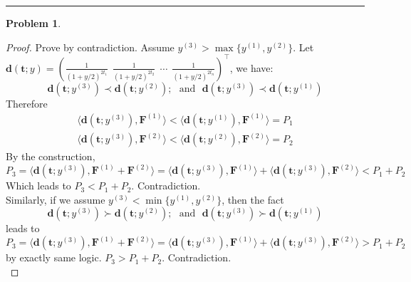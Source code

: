 \documentclass[a4paper, 10pt]{article}
\theoremstyle{definition}
\newtheorem{problem}{Problem}
\theoremstyle{hSol}
\begin{document}
\noindent\rule{16cm}{0.4pt}
\begin{problem} 
\end{problem}
\begin{proof} Prove by contradiction. Assume $y^{(3)}>\max\{y^{(1)}, y^{(2)}\}$. Let $\bm{d}(\bm{t}; y) = (\tfrac{1}{(1+y/2)^{2t_1}} ~~ \tfrac{1}{(1+y/2)^{2t_2}} ~~\cdots~~ \tfrac{1}{(1+y/2)^{2t_n}})^{\top}$, we have:
\begin{equation}
  \bm{d}(\bm{t}; y^{(3)}) \prec \bm{d}(\bm{t}; y^{(2)});~~~\text{and}~~~\bm{d}(\bm{t}; y^{(3)}) \prec \bm{d}(\bm{t}; y^{(1)})
\end{equation}
Therefore
\begin{equation}
  \begin{split}
    \langle \bm{d}(\bm{t}; y^{(3)}), \bm{F}^{(1)} \rangle < \langle \bm{d}(\bm{t}; y^{(1)}), \bm{F}^{(1)} \rangle = P_1 \\
    \langle \bm{d}(\bm{t}; y^{(3)}), \bm{F}^{(2)} \rangle < \langle \bm{d}(\bm{t}; y^{(2)}), \bm{F}^{(2)} \rangle = P_2
  \end{split}
\end{equation}
By the construction, 
\begin{equation}
  P_3 = \langle \bm{d}(\bm{t}; y^{(3)}),  \bm{F}^{(1)}+\bm{F}^{(2)}\rangle = \langle \bm{d}(\bm{t}; y^{(3)}), \bm{F}^{(1)} \rangle + \langle \bm{d}(\bm{t}; y^{(3)}), \bm{F}^{(2)} \rangle < P_1 + P_2
\end{equation}
Which leads to $P_3 < P_1 + P_2$. Contradiction.\\
Similarly, if we assume $y^{(3)}<\min\{y^{(1)}, y^{(2)}\}$, then the fact
\begin{equation}
  \bm{d}(\bm{t}; y^{(3)}) \succ \bm{d}(\bm{t}; y^{(2)});~~~\text{and}~~~\bm{d}(\bm{t}; y^{(3)}) \succ \bm{d}(\bm{t}; y^{(1)})
\end{equation}
leads to 
\begin{equation}
  P_3 = \langle \bm{d}(\bm{t}; y^{(3)}),  \bm{F}^{(1)}+\bm{F}^{(2)}\rangle = \langle \bm{d}(\bm{t}; y^{(3)}), \bm{F}^{(1)} \rangle + \langle \bm{d}(\bm{t}; y^{(3)}), \bm{F}^{(2)} \rangle > P_1 + P_2
\end{equation}
by exactly same logic. $P_3 > P_1 + P_2$. Contradiction.\\

\end{proof}
\end{document}
